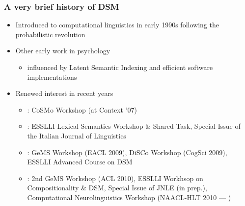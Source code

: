 \begin{frame}
  \frametitle{A very brief history of DSM}

  \begin{itemize}
  \item Introduced to computational linguistics in early 1990s
    following the probabilistic revolution \citep{Schuetze:92,Schuetze:98}
  \item Other early work in psychology \citep{Landauer:Dumais:97,Lund:Burgess:96}
    \begin{itemize}
    \item[\hand] influenced by Latent Semantic Indexing \citep{Dumais:etc:88} and efficient software implementations \citep{Berry:92}
    \end{itemize}
  \item<2-> Renewed interest in recent years
    \begin{itemize}
    \item<2-> : CoSMo Workshop (at Context '07)
    \item<3-> : ESSLLI Lexical Semantics Workshop \& Shared Task, Special Issue of the Italian Journal of Linguistics
    \item<4-> : GeMS Workshop (EACL 2009), DiSCo Workshop (CogSci 2009), ESSLLI Advanced Course on DSM
    \item<5-> : 2nd GeMS Workshop (ACL 2010), ESSLLI Workhsop on Compositionality \& DSM, Special Issue of JNLE (in prep.), Computational Neurolinguistics Workshop (NAACL-HLT 2010 --- )
    \end{itemize}
  \end{itemize}
\end{frame}

